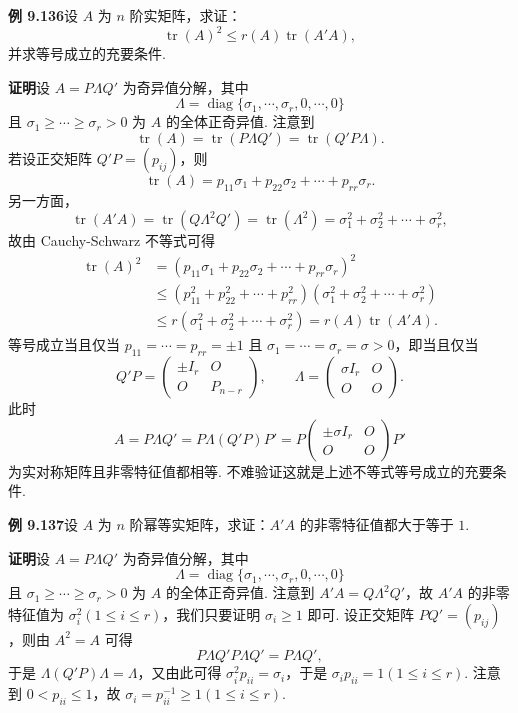 \documentclass[UTF8, 12pt, fontset=fandol, oneside]{ctexart}
\begin{document}
\noindent\textbf{例 9.136}\quad 设 $A$ 为 $n$ 阶实矩阵，求证：
\[
\operatorname{tr}(A)^2\le r(A)\operatorname{tr}(A'A),
\]
并求等号成立的充要条件.

\noindent\textbf{证明}\quad 设 $A=P\Lambda Q'$ 为奇异值分解，其中
\[
\Lambda=\operatorname{diag}\{\sigma_1,\cdots,\sigma_r,0,\cdots,0\}
\]
且 $\sigma_1\ge\cdots\ge\sigma_r>0$ 为 $A$ 的全体正奇异值. 注意到
\[
\operatorname{tr}(A)=\operatorname{tr}(P\Lambda Q')=\operatorname{tr}(Q'P\Lambda).
\]
若设正交矩阵 $Q'P=(p_{ij})$，则
\[
\operatorname{tr}(A)=p_{11}\sigma_1+p_{22}\sigma_2+\cdots+p_{rr}\sigma_r.
\]
另一方面，
\[
\operatorname{tr}(A'A)=\operatorname{tr}(Q\Lambda^2Q')=\operatorname{tr}(\Lambda^2)=\sigma_1^2+\sigma_2^2+\cdots+\sigma_r^2,
\]
故由 Cauchy-Schwarz 不等式可得
\[
\begin{aligned}
\operatorname{tr}(A)^2
&=(p_{11}\sigma_1+p_{22}\sigma_2+\cdots+p_{rr}\sigma_r)^2\\
&\le(p_{11}^2+p_{22}^2+\cdots+p_{rr}^2)(\sigma_1^2+\sigma_2^2+\cdots+\sigma_r^2)\\
&\le r(\sigma_1^2+\sigma_2^2+\cdots+\sigma_r^2)=r(A)\operatorname{tr}(A'A).
\end{aligned}
\]
等号成立当且仅当 $p_{11}=\cdots=p_{rr}=\pm1$ 且 $\sigma_1=\cdots=\sigma_r=\sigma>0$，即当且仅当
\[
Q'P=\begin{pmatrix}
\pm I_r&O\\
O&P_{n-r}
\end{pmatrix},\qquad
\Lambda=\begin{pmatrix}
\sigma I_r&O\\
O&O
\end{pmatrix}.
\]
此时
\[
A=P\Lambda Q'=P\Lambda(Q'P)P'=P\begin{pmatrix}
\pm\sigma I_r&O\\
O&O
\end{pmatrix}P'
\]
为实对称矩阵且非零特征值都相等. 不难验证这就是上述不等式等号成立的充要条件.

\noindent\textbf{例 9.137}\quad 设 $A$ 为 $n$ 阶幂等实矩阵，求证：$A'A$ 的非零特征值都大于等于 $1$.

\noindent\textbf{证明}\quad 设 $A=P\Lambda Q'$ 为奇异值分解，其中
\[
\Lambda=\operatorname{diag}\{\sigma_1,\cdots,\sigma_r,0,\cdots,0\}
\]
且 $\sigma_1\ge\cdots\ge\sigma_r>0$ 为 $A$ 的全体正奇异值. 注意到 $A'A=Q\Lambda^2Q'$，故 $A'A$ 的非零特征值为 $\sigma_i^2(1\le i\le r)$，我们只要证明 $\sigma_i\ge1$ 即可. 设正交矩阵 $PQ'=(p_{ij})$，则由 $A^2=A$ 可得
\[
P\Lambda Q'P\Lambda Q'=P\Lambda Q',
\]
于是 $\Lambda(Q'P)\Lambda=\Lambda$，又由此可得 $\sigma_i^2p_{ii}=\sigma_i$，于是 $\sigma_ip_{ii}=1(1\le i\le r)$. 注意到 $0<p_{ii}\le1$，故 $\sigma_i=p_{ii}^{-1}\ge1(1\le i\le r)$.
\end{document}
